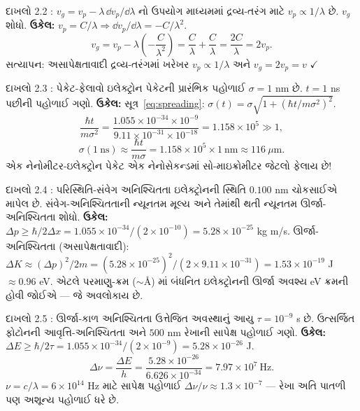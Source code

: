 \begin{dahlo}{દાખલો 2.2 : $v_g=v_p-\lambda\,\dd v_p/\dd\lambda$ નો ઉપયોગ}
માધ્યમમાં દ્રવ્ય-તરંગ માટે $v_p\propto1/\lambda$ છે. $v_g$ શોધો.
\tcblower
\textbf{ઉકેલ:} $v_p=C/\lambda\Rightarrow\dd v_p/\dd\lambda=-C/\lambda^{2}$.
\[
v_g=v_p-\lambda\left(-\frac{C}{\lambda^{2}}\right)=\frac{C}{\lambda}+\frac{C}{\lambda}=\frac{2C}{\lambda}=2v_p .
\]
સત્યાપન: અસાપેક્ષતાવાદી દ્રવ્ય-તરંગમાં ખરેખર $v_p\propto1/\lambda$ અને $v_g=2v_p=v$ $\checkmark$
\end{dahlo}

\begin{dahlo}{દાખલો 2.3 : પેકેટ-ફેલાવો}
ઇલેક્ટ્રોન પેકેટની પ્રારંભિક પહોળાઈ $\sigma=1$ nm છે. $t=1$ ns પછીની પહોળાઈ ગણો.
\tcblower
\textbf{ઉકેલ:} સૂત્ર~\eqref{eq:spreading}: $\sigma(t)=\sigma\sqrt{1+(\hbar t/m\sigma^2)^2}$.
\[
\frac{\hbar t}{m\sigma^{2}}=\frac{1.055\times10^{-34}\times10^{-9}}{9.11\times10^{-31}\times10^{-18}}
=1.158\times10^{5}\gg1 ,
\]
\[
\sigma(1\ \text{ns})\approx\frac{\hbar t}{m\sigma}=1.158\times10^{5}\times1\ \text{nm}\approx116\ \mu\mathrm{m}.
\]
એક નેનોમીટર-ઇલેક્ટ્રોન પેકેટ એક નેનોસેકન્ડમાં સો-માઇક્રોમીટર જેટલો ફેલાય છે!
\end{dahlo}

\begin{dahlo}{દાખલો 2.4 : પરિસ્થિતિ-સંવેગ અનિશ્ચિતતા}
ઇલેક્ટ્રોનની સ્થિતિ $0.100$ nm ચોકસાઈએ માપેલ છે. સંવેગ-અનિશ્ચિતતાની ન્યૂનતમ મૂલ્ય અને તેમાંથી થતી ન્યૂનતમ ઊર્જા-અનિશ્ચિતતા શોધો.
\tcblower
\textbf{ઉકેલ:} $\Delta p\ge\hbar/2\Delta x=1.055\times10^{-34}/(2\times10^{-10})=5.28\times10^{-25}$ kg m/s.
ઊર્જા-અનિશ્ચિતતા (અસાપેક્ષતાવાદી): $\Delta K\approx(\Delta p)^2/2m=(5.28\times10^{-25})^2/(2\times9.11\times10^{-31})=1.53\times10^{-19}$ J $\approx0.96$ eV.
એટલે પરમાણુ-ક્રમ ($\sim$Å) માં બંધનિત ઇલેક્ટ્રોનની ઊર્જા અવશ્ય eV ક્રમની હોવી જોઈએ — જે અવલોકાય છે.
\end{dahlo}

\begin{dahlo}{દાખલો 2.5 : ઊર્જા-કાળ અનિશ્ચિતતા}
ઉત્તેજિત અવસ્થાનું આયુ $\tau=10^{-9}$ s છે. ઉત્સર્જિત ફોટોનની આવૃત્તિ-અનિશ્ચિતતા અને $500$ nm રેખાની સાપેક્ષ પહોળાઈ ગણો.
\tcblower
\textbf{ઉકેલ:} $\Delta E\ge\hbar/2\tau=1.055\times10^{-34}/(2\times10^{-9})=5.28\times10^{-26}$ J.
\[
\Delta\nu=\frac{\Delta E}{h}=\frac{5.28\times10^{-26}}{6.626\times10^{-34}}=7.97\times10^{7}\ \mathrm{Hz}.
\]
$\nu=c/\lambda=6\times10^{14}$ Hz માટે સાપેક્ષ પહોળાઈ $\Delta\nu/\nu\approx1.3\times10^{-7}$ — રેખા અતિ પાતળી પણ અશૂન્ય પહોળાઈ ધરે છે.
\end{dahlo}

